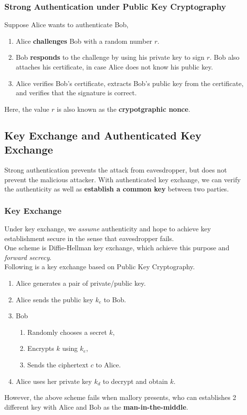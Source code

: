 \documentclass[12pt]{article}
\theoremstyle{definition}
\begin{document}
\subsubsection{Strong Authentication under Public Key Cryptography}
Suppose Alice wants to authenticate Bob,
\begin{enumerate}
  \item Alice \textbf{challenges} Bob with a random number $r$.
  \item Bob \textbf{responds} to the challenge by using his private key to sign $r$. Bob also attaches his certificate, in case Alice does not know his public key.
  \item Alice verifies Bob's certificate,  extracts Bob's public key from the certificate, and verifies that the signature is correct.
\end{enumerate}
Here, the value $r$ is also known as the \textbf{crypotgraphic nonce}.
\subsection{Key Exchange and Authenticated Key Exchange}
Strong authentication prevents the attack from eavesdropper, but does not prevent the malicious attacker. With authenticated key exchange, we can verify the authenticity as well as \textbf{establish a common key} between two parties.
\subsubsection{Key Exchange}
Under key exchange, we \textit{assume} authenticity and hope to achieve key establishment secure in the sense that eavesdropper fails. \\
One scheme is Diffie-Hellman key exchange, which achieve this purpose and \textit{forward secrecy}.\\
Following is a key exchange based on Public Key Cryptography.
\begin{enumerate}
  \item Alice generates a pair of private/public key.
  \item Alice sends the public key $k_e$ to Bob.
  \item Bob
  \begin{enumerate}
    \item Randomly chooses a secret $k$,
    \item Encrypts $k$ using $k_e$,
    \item Sends the ciphertext $c$ to Alice.
  \end{enumerate}
  \item Alice uses her private key $k_d$ to decrypt and obtain $k$.
\end{enumerate}
However, the above scheme fails when mallory presents, who can establishes 2 different key with Alice and Bob as the \textbf{man-in-the-middle}.\\
\end{document}

